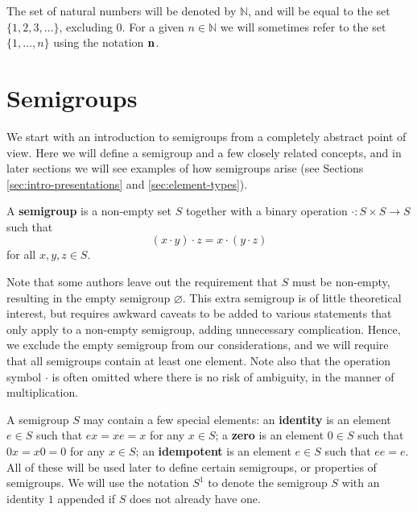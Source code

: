 The set of natural numbers will be denoted by $\mathbb{N}$, and will be equal to
the set $\{1, 2, 3, \ldots\}$, excluding $0$.  For a given $n \in \mathbb{N}$ we
will sometimes refer to the set $\{1, \ldots, n\}$ using the notation $\mathbf{n}$.

\section{Semigroups}
\label{sec:intro-semigroups}
We start with an introduction to semigroups from a completely abstract point of
view.  Here we will define a semigroup and a few closely related concepts, and
in later sections we will see examples of how semigroups arise (see Sections
\ref{sec:intro-presentations} and \ref{sec:element-types}).

\begin{definition}
  \label{def:semigroup}
  A \textbf{semigroup} is a non-empty set $S$ together with
  a binary operation $\cdot: S \times S \to S$ such that
  $$(x \cdot y) \cdot z = x \cdot (y \cdot z)$$
  for all $x, y, z \in S$.
\end{definition}
Note that some authors leave out the requirement that $S$ must be non-empty,
resulting in the empty semigroup $\varnothing$.  This extra semigroup is of
little theoretical interest, but requires awkward caveats to be added to various
statements that only apply to a non-empty semigroup, adding unnecessary
complication.  Hence, we exclude the empty semigroup from our considerations,
and we will require that all semigroups contain at least one element.  Note also
that the operation symbol $\cdot$ is often omitted where there is no risk of
ambiguity, in the manner of multiplication.

A semigroup $S$ may contain a few special elements: an \textbf{identity} is an
element $e \in S$ such that $ex = xe = x$ for any $x \in S$; a \textbf{zero} is
an element $0 \in S$ such that $0x = x0 = 0$ for any $x \in S$; an
\textbf{idempotent} is an element $e \in S$ such that $ee=e$.  All of these will
be used later to define certain semigroups, or properties of semigroups.  We
will use the notation $S^1$ to denote the semigroup $S$ with an identity $1$
appended if $S$ does not already have one.
  

